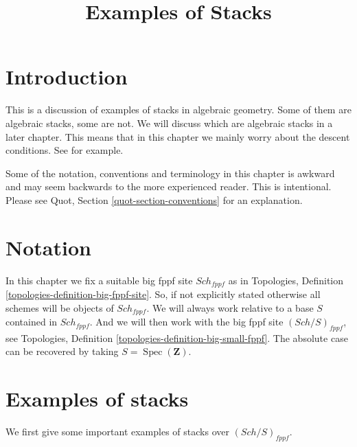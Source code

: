 \documentclass{stacks-project}
\theoremstyle{plain}
\theoremstyle{definition}
\theoremstyle{remark}
\numberwithin{equation}{subsection}
\def\Spec{\mathop{\mathrm{Spec}}}
\def\Sch{\mathit{Sch}}
\begin{document}
\title{Examples of Stacks}


\maketitle

\label{section-phantom}

\tableofcontents

\section{Introduction}
\label{section-introduction}

\noindent
This is a discussion of examples of stacks in algebraic geometry.
Some of them are algebraic stacks, some are not.
We will discuss which are algebraic stacks in a later chapter.
This means that in this chapter we mainly worry about the descent
conditions. See \cite{Vis2} for example.

\medskip\noindent
Some of the notation, conventions and terminology in this chapter is awkward
and may seem backwards to the more experienced reader. This is intentional.
Please see Quot, Section \ref{quot-section-conventions} for an
explanation.




\section{Notation}
\label{section-notation}

\noindent
In this chapter we fix a suitable big fppf site $\Sch_{fppf}$
as in Topologies, Definition \ref{topologies-definition-big-fppf-site}.
So, if not explicitly stated otherwise all schemes will be objects
of $\Sch_{fppf}$.
We will always work relative to a base $S$ contained in $\Sch_{fppf}$.
And we will then work with the big fppf site $(\Sch/S)_{fppf}$,
see Topologies, Definition \ref{topologies-definition-big-small-fppf}.
The absolute case can be recovered by taking
$S = \Spec(\mathbf{Z})$.




\section{Examples of stacks}
\label{section-examples-stacks}

\noindent
We first give some important examples of stacks over
$(\Sch/S)_{fppf}$.
\end{document}
